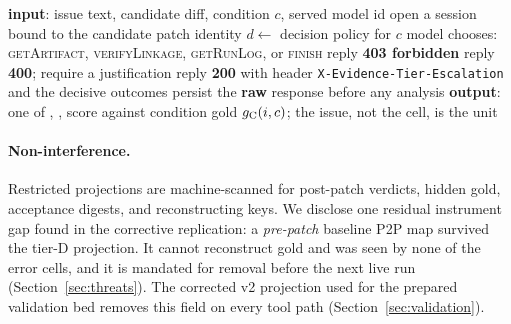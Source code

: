 \begin{algorithm}[t]
\caption{GroundedReview cell protocol (one issue $i$, condition $c$, model $m$)}
\label{alg:protocol}
\begin{algorithmic}[1]
\State \textbf{input}: issue text, candidate diff, condition $c$, served model id
\State open a session bound to the candidate patch identity 
\State $d \gets{}$ decision policy for $c$ 
  \Loop
    \State model chooses: \textsc{getArtifact}, \textsc{verifyLinkage}, \textsc{getRunLog}, or \textsc{finish}
       \State reply \textbf{403 forbidden} 
       \State reply \textbf{400}; require a justification
       \State reply \textbf{200} with header \texttt{X-Evidence-Tier-Escalation} and the decisive outcomes
    \EndIf
  \EndLoop
\EndIf
\State persist the \textbf{raw} response before any analysis 
\State \textbf{output}: one of \ACCEPT, \REJECT, \NEED
\State score against condition gold $g_{\mathrm{C}}(i,c)$; the issue, not the cell, is the unit
\end{algorithmic}
\end{algorithm}

\paragraph{Non-interference.}
Restricted projections are machine-scanned for post-patch verdicts, hidden
gold, acceptance digests, and reconstructing keys. We disclose one residual
instrument gap found in the corrective replication: a \emph{pre-patch}
baseline P2P map survived the tier-D projection. It cannot reconstruct gold
and was seen by none of the error cells, and it is mandated for removal before
the next live run (Section~\ref{sec:threats}). The corrected v2 projection used
for the prepared validation bed removes this field on every tool path
(Section~\ref{sec:validation}).
